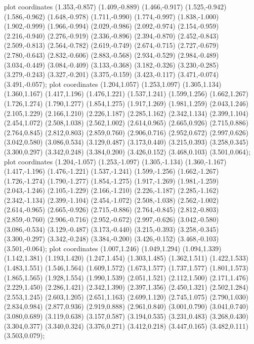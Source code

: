  plot coordinates {(1.353,-0.857) (1.409,-0.889) (1.466,-0.917) (1.525,-0.942) (1.586,-0.962) (1.648,-0.978) (1.711,-0.990) (1.774,-0.997) (1.838,-1.000) (1.902,-0.999) (1.966,-0.994) (2.029,-0.986) (2.092,-0.974) (2.154,-0.959) (2.216,-0.940) (2.276,-0.919) (2.336,-0.896) (2.394,-0.870) (2.452,-0.843) (2.509,-0.813) (2.564,-0.782) (2.619,-0.749) (2.674,-0.715) (2.727,-0.679) (2.780,-0.643) (2.832,-0.606) (2.883,-0.568) (2.934,-0.529) (2.984,-0.489) (3.034,-0.449) (3.084,-0.409) (3.133,-0.368) (3.182,-0.326) (3.230,-0.285) (3.279,-0.243) (3.327,-0.201) (3.375,-0.159) (3.423,-0.117) (3.471,-0.074) (3.491,-0.057)};
 plot coordinates {(1.204,1.057) (1.253,1.097) (1.305,1.134) (1.360,1.167) (1.417,1.196) (1.476,1.221) (1.537,1.241) (1.599,1.256) (1.662,1.267) (1.726,1.274) (1.790,1.277) (1.854,1.275) (1.917,1.269) (1.981,1.259) (2.043,1.246) (2.105,1.229) (2.166,1.210) (2.226,1.187) (2.285,1.162) (2.342,1.134) (2.399,1.104) (2.454,1.072) (2.508,1.038) (2.562,1.002) (2.614,0.965) (2.665,0.926) (2.715,0.886) (2.764,0.845) (2.812,0.803) (2.859,0.760) (2.906,0.716) (2.952,0.672) (2.997,0.626) (3.042,0.580) (3.086,0.534) (3.129,0.487) (3.173,0.440) (3.215,0.393) (3.258,0.345) (3.300,0.297) (3.342,0.248) (3.384,0.200) (3.426,0.152) (3.468,0.103) (3.501,0.064)};
 plot coordinates {(1.204,-1.057) (1.253,-1.097) (1.305,-1.134) (1.360,-1.167) (1.417,-1.196) (1.476,-1.221) (1.537,-1.241) (1.599,-1.256) (1.662,-1.267) (1.726,-1.274) (1.790,-1.277) (1.854,-1.275) (1.917,-1.269) (1.981,-1.259) (2.043,-1.246) (2.105,-1.229) (2.166,-1.210) (2.226,-1.187) (2.285,-1.162) (2.342,-1.134) (2.399,-1.104) (2.454,-1.072) (2.508,-1.038) (2.562,-1.002) (2.614,-0.965) (2.665,-0.926) (2.715,-0.886) (2.764,-0.845) (2.812,-0.803) (2.859,-0.760) (2.906,-0.716) (2.952,-0.672) (2.997,-0.626) (3.042,-0.580) (3.086,-0.534) (3.129,-0.487) (3.173,-0.440) (3.215,-0.393) (3.258,-0.345) (3.300,-0.297) (3.342,-0.248) (3.384,-0.200) (3.426,-0.152) (3.468,-0.103) (3.501,-0.064)};
 plot coordinates {(1.007,1.246) (1.049,1.294) (1.094,1.339) (1.142,1.381) (1.193,1.420) (1.247,1.454) (1.303,1.485) (1.362,1.511) (1.422,1.533) (1.483,1.551) (1.546,1.564) (1.609,1.572) (1.673,1.577) (1.737,1.577) (1.801,1.573) (1.865,1.565) (1.928,1.554) (1.990,1.539) (2.051,1.521) (2.112,1.500) (2.171,1.476) (2.229,1.450) (2.286,1.421) (2.342,1.390) (2.397,1.356) (2.450,1.321) (2.502,1.284) (2.553,1.245) (2.603,1.205) (2.651,1.163) (2.699,1.120) (2.745,1.075) (2.790,1.030) (2.834,0.984) (2.877,0.936) (2.919,0.888) (2.961,0.840) (3.001,0.790) (3.041,0.740) (3.080,0.689) (3.119,0.638) (3.157,0.587) (3.194,0.535) (3.231,0.483) (3.268,0.430) (3.304,0.377) (3.340,0.324) (3.376,0.271) (3.412,0.218) (3.447,0.165) (3.482,0.111) (3.503,0.079)};
